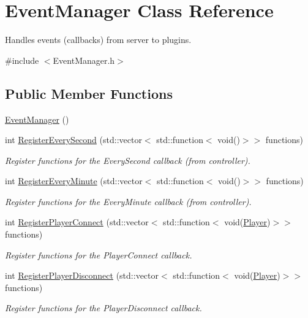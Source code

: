 \hypertarget{classEventManager}{\section{Event\-Manager Class Reference}
\label{classEventManager}
}


Handles events (callbacks) from server to plugins.  




{\ttfamily \#include $<$Event\-Manager.\-h$>$}

\subsection*{Public Member Functions}
\begin{DoxyCompactItemize}
\item 
\hyperlink{classEventManager_a89099b22114f158b5c530edfea52371d}{Event\-Manager} ()
\item 
int \hyperlink{classEventManager_acb7862da212bc7ce1d20af2fea8d1ba3}{Register\-Every\-Second} (std\-::vector$<$ std\-::function$<$ void()$>$$>$ functions)
\begin{DoxyCompactList}\small\item\em Register functions for the Every\-Second callback (from controller). \end{DoxyCompactList}\item 
int \hyperlink{classEventManager_a0ebbc9674a8f664c975d3ecdc27346f1}{Register\-Every\-Minute} (std\-::vector$<$ std\-::function$<$ void()$>$$>$ functions)
\begin{DoxyCompactList}\small\item\em Register functions for the Every\-Minute callback (from controller). \end{DoxyCompactList}\item 
int \hyperlink{classEventManager_a26aec3d9c2cfbdcb62c0f8e432c2fcae}{Register\-Player\-Connect} (std\-::vector$<$ std\-::function$<$ void(\hyperlink{structPlayer}{Player})$>$$>$ functions)
\begin{DoxyCompactList}\small\item\em Register functions for the Player\-Connect callback. \end{DoxyCompactList}\item 
int \hyperlink{classEventManager_a56ed11f893eb5beebfbf294a196005e5}{Register\-Player\-Disconnect} (std\-::vector$<$ std\-::function$<$ void(\hyperlink{structPlayer}{Player})$>$$>$ functions)
\begin{DoxyCompactList}\small\item\em Register functions for the Player\-Disconnect callback. \end{DoxyCompactList}\item 

\end{DoxyCompactItemize}
